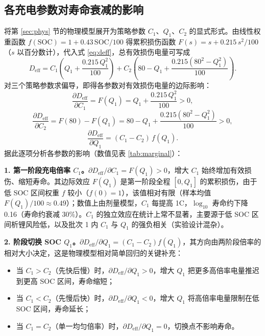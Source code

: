 \documentclass[withoutpreface]{cumcmthesis}
\begin{document}
\subsection{各充电参数对寿命衰减的影响}

将第 \ref{sec:phys} 节的物理模型展开为策略参数 $C_1$、$Q_1$、$C_2$ 的显式形式。由线性权重函数 $f(\mathrm{SOC})=1+0.43\,\mathrm{SOC}/100$ 得累积损伤函数 $F(s)=s+0.215\,s^2/100$（$s$ 以百分数计），代入式 \eqref{eq:deff}，总有效损伤电量可写成
\begin{equation}\label{eq:deff-explicit}
D_{\mathrm{eff}} = C_1\left(Q_1 + \frac{0.215\,Q_1^2}{100}\right) + C_2\left(80-Q_1 + \frac{0.215(80^2-Q_1^2)}{100}\right).
\end{equation}
对三个策略参数求偏导，即得各参数对有效损伤电量的边际影响：
\begin{equation}\label{eq:pd-c1}
\frac{\partial D_{\mathrm{eff}}}{\partial C_1} = F(Q_1) = Q_1 + \frac{0.215\,Q_1^2}{100} > 0,
\end{equation}
\begin{equation}\label{eq:pd-c2}
\frac{\partial D_{\mathrm{eff}}}{\partial C_2} = F(80)-F(Q_1) = 80-Q_1 + \frac{0.215(80^2-Q_1^2)}{100} > 0,
\end{equation}
\begin{equation}\label{eq:pd-q1}
\frac{\partial D_{\mathrm{eff}}}{\partial Q_1} = (C_1-C_2)\,f(Q_1).
\end{equation}
据此逐项分析各参数的影响（数值见表 \ref{tab:marginal}）：

\textbf{1. 第一阶段充电倍率 $C_1$。}$\partial D_{\mathrm{eff}}/\partial C_1=F(Q_1)>0$，增大 $C_1$ 始终增加有效损伤、缩短寿命。其边际效应 $F(Q_1)$ 是第一阶段全程 $[0,Q_1]$ 的累积损伤，由于低 SOC 区间权重 $f$ 较小（$f(0)=1$），该值相对有限（样本均值 $F(Q_1)/100\approx0.49$）；数值上由剂量模型，$C_1$ 每提高 1C，$\log_{10}$ 寿命约下降 0.16（寿命约衰减 30\%）。$C_1$ 的独立效应在统计上常不显著，主要源于低 SOC 区间析锂风险低，以及批次 1 内 $C_1$ 与 $Q_1$ 的强负相关（实验设计混杂）。

\textbf{2. 阶段切换 SOC $Q_1$。}$\partial D_{\mathrm{eff}}/\partial Q_1=(C_1-C_2)f(Q_1)$，其方向由两阶段倍率的相对大小决定，这是物理模型相对简单回归的关键补充：
\begin{itemize}
\item 当 $C_1>C_2$（先快后慢）时，$\partial D_{\mathrm{eff}}/\partial Q_1>0$，增大 $Q_1$ 把更多高倍率电量推迟到更高 SOC 区间，寿命缩短；
\item 当 $C_1<C_2$（先慢后快）时，$\partial D_{\mathrm{eff}}/\partial Q_1<0$，增大 $Q_1$ 将高倍率电量限制在低 SOC 区间，寿命延长；
\item 当 $C_1=C_2$（单一均匀倍率）时，$\partial D_{\mathrm{eff}}/\partial Q_1=0$，切换点不影响寿命。
\end{itemize}
\end{document}
